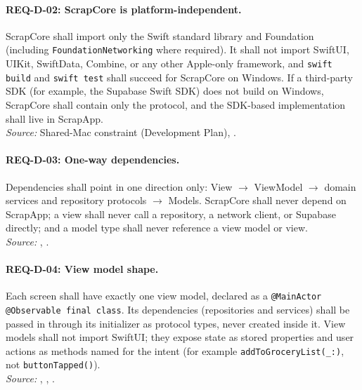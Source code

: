\paragraph{REQ-D-02: ScrapCore is platform-independent.}
 ScrapCore shall import only the Swift standard library and Foundation (including \texttt{FoundationNetworking} where required). It shall not import SwiftUI, UIKit, SwiftData, Combine, or any other Apple-only framework, and \texttt{swift build} and \texttt{swift test} shall succeed for ScrapCore on Windows. If a third-party SDK (for example, the Supabase Swift SDK) does not build on Windows, ScrapCore shall contain only the protocol, and the SDK-based implementation shall live in ScrapApp.\\
\textit{Source:} Shared-Mac constraint (Development Plan), .

\paragraph{REQ-D-03: One-way dependencies.}
 Dependencies shall point in one direction only: View $\rightarrow$ ViewModel $\rightarrow$ domain services and repository protocols $\rightarrow$ Models. ScrapCore shall never depend on ScrapApp; a view shall never call a repository, a network client, or Supabase directly; and a model type shall never reference a view model or view.\\
\textit{Source:} , .

\paragraph{REQ-D-04: View model shape.}
 Each screen shall have exactly one view model, declared as a \texttt{@MainActor @Observable final class}. Its dependencies (repositories and services) shall be passed in through its initializer as protocol types, never created inside it. View models shall not import SwiftUI; they expose state as stored properties and user actions as methods named for the intent (for example \texttt{addToGroceryList(\_:)}, not \texttt{buttonTapped()}).\\
\textit{Source:} , , .


